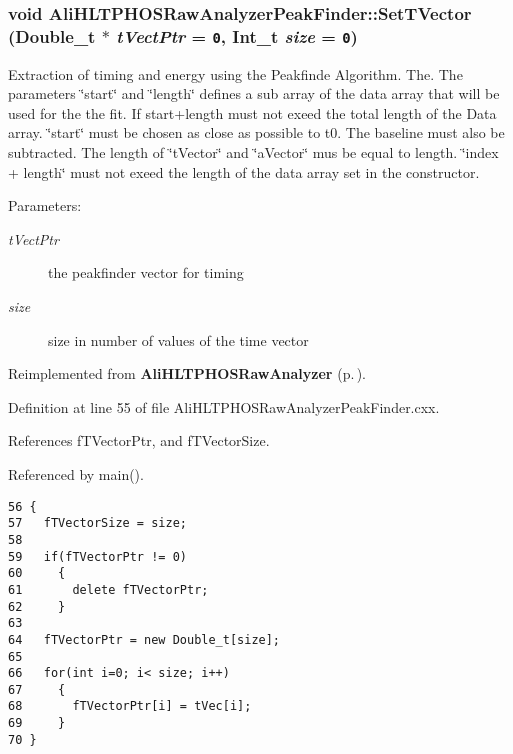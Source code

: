 \subsubsection{\setlength{\rightskip}{0pt plus 5cm}void Ali\-HLTPHOSRaw\-Analyzer\-Peak\-Finder::Set\-TVector (Double\_\-t $\ast$ {\em t\-Vect\-Ptr} = {\tt 0}, Int\_\-t {\em size} = {\tt 0})\hspace{0.3cm}{\tt  [virtual]}}\label{classAliHLTPHOSRawAnalyzerPeakFinder_a4}


Extraction of timing and energy using the Peakfinde Algorithm. The. The parameters \char`\"{}start\char`\"{} and \char`\"{}length\char`\"{} defines a sub array of the data array that will be used for the the fit. If start+length must not exeed the total length of the Data array. \char`\"{}start\char`\"{} must be chosen as close as possible to t0. The baseline must also be subtracted. The length of \char`\"{}t\-Vector\char`\"{} and \char`\"{}a\-Vector\char`\"{} mus be equal to length. \char`\"{}index + length\char`\"{} must not exeed the length of the data array set in the constructor. \begin{Desc}
\item[Parameters:]
\begin{description}
\item[{\em t\-Vect\-Ptr}]the peakfinder vector for timing \item[{\em size}]size in number of values of the time vector \end{description}
\end{Desc}


Reimplemented from {\bf Ali\-HLTPHOSRaw\-Analyzer} {\rm (p.\,\pageref{classAliHLTPHOSRawAnalyzer_a15})}.

Definition at line 55 of file Ali\-HLTPHOSRaw\-Analyzer\-Peak\-Finder.cxx.

References f\-TVector\-Ptr, and f\-TVector\-Size.

Referenced by main().

\footnotesize\begin{verbatim}56 {
57   fTVectorSize = size;
58 
59   if(fTVectorPtr != 0)
60     {
61       delete fTVectorPtr;
62     }
63   
64   fTVectorPtr = new Double_t[size];
65 
66   for(int i=0; i< size; i++)
67     {
68       fTVectorPtr[i] = tVec[i];
69     }
70 }
\end{verbatim}\normalsize 




